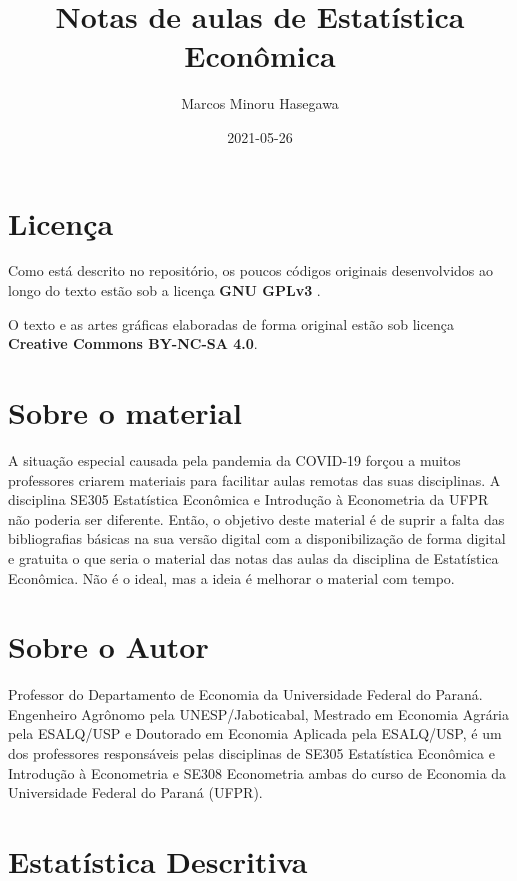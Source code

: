 \documentclass[
]{book}
\title{Notas de aulas de Estatística Econômica}
\author{Marcos Minoru Hasegawa}
\date{2021-05-26}
\begin{document}
\maketitle

{
\setcounter{tocdepth}{1}
\tableofcontents
}
\hypertarget{licenuxe7a}{%
\chapter*{Licença}\label{licenuxe7a}}

Como está descrito no repositório, os poucos códigos originais desenvolvidos ao longo do texto estão sob a licença \textbf{GNU GPLv3} .

O texto e as artes gráficas elaboradas de forma original estão sob licença \textbf{Creative Commons BY-NC-SA 4.0}.

\hypertarget{sobre-o-material}{%
\chapter*{Sobre o material}\label{sobre-o-material}}

A situação especial causada pela pandemia da COVID-19 forçou a muitos professores criarem materiais para facilitar aulas remotas das suas disciplinas. A disciplina SE305 Estatística Econômica e Introdução à Econometria da UFPR não poderia ser diferente. Então, o objetivo deste material é de suprir a falta das bibliografias básicas na sua versão digital com a disponibilização de forma digital e gratuita o que seria o material das notas das aulas da disciplina de Estatística Econômica. Não é o ideal, mas a ideia é melhorar o material com tempo.

\hypertarget{sobre-o-autor}{%
\chapter*{Sobre o Autor}\label{sobre-o-autor}}

Professor do Departamento de Economia da Universidade Federal do Paraná. Engenheiro Agrônomo pela UNESP/Jaboticabal, Mestrado em Economia Agrária pela ESALQ/USP e Doutorado em Economia Aplicada pela ESALQ/USP, é um dos professores responsáveis pelas disciplinas de SE305 Estatística Econômica e Introdução à Econometria e SE308 Econometria ambas do curso de Economia da Universidade Federal do Paraná (UFPR).

\hypertarget{estatuxedstica-descritiva}{%
\chapter{Estatística Descritiva}\label{estatuxedstica-descritiva}}
\end{document}
